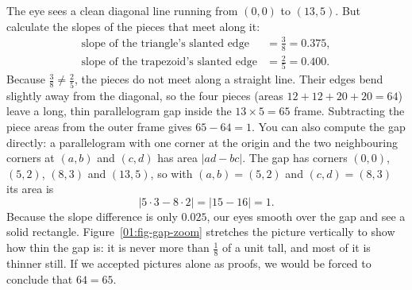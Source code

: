 The eye sees a clean diagonal line running from $(0,0)$ to $(13,5)$. But calculate the slopes of the pieces that meet along it:
\begin{align*}
\text{slope of the triangle's slanted edge} &= \frac{3}{8} = 0.375, \\
\text{slope of the trapezoid's slanted edge} &= \frac{2}{5} = 0.400.
\end{align*}
Because $\frac{3}{8} \ne \frac{2}{5}$, the pieces do not meet along a straight line. Their edges bend slightly away from the diagonal, so the four pieces (areas $12 + 12 + 20 + 20 = 64$) leave a long, thin parallelogram gap inside the $13 \times 5 = 65$ frame. Subtracting the piece areas from the outer frame gives $65 - 64 = 1$. You can also compute the gap directly: a parallelogram with one corner at the origin and the two neighbouring corners at $(a, b)$ and $(c, d)$ has area $\lvert ad - bc \rvert$. The gap has corners $(0,0)$, $(5,2)$, $(8,3)$ and $(13,5)$, so with $(a,b) = (5,2)$ and $(c,d) = (8,3)$ its area is
\[
\lvert 5 \cdot 3 - 8 \cdot 2 \rvert = \lvert 15 - 16 \rvert = 1.
\]
Because the slope difference is only $0.025$, our eyes smooth over the gap and see a solid rectangle. Figure~\ref{01:fig-gap-zoom} stretches the picture vertically to show how thin the gap is: it is never more than $\tfrac{1}{8}$ of a unit tall, and most of it is thinner still. If we accepted pictures alone as proofs, we would be forced to conclude that $64 = 65$.

